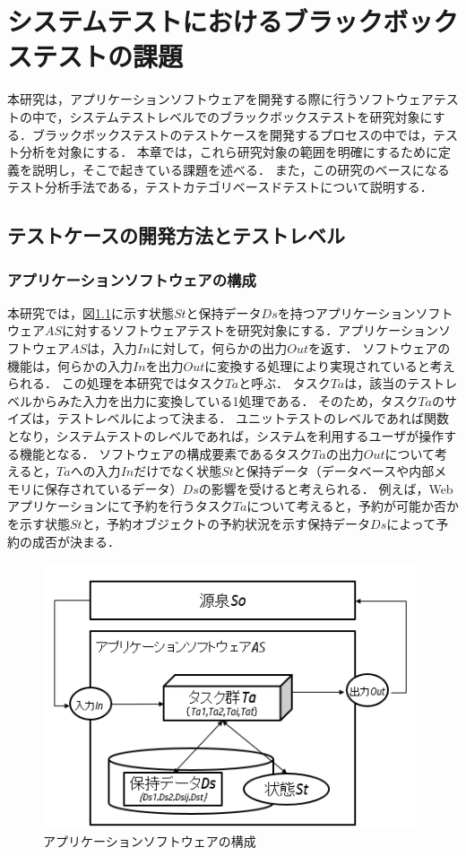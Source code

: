 \chapter{システムテストにおけるブラックボックステストの課題}
本研究は，アプリケーションソフトウェアを開発する際に行うソフトウェアテストの中で，システムテストレベルでのブラックボックステストを研究対象にする．ブラックボックステストのテストケースを開発するプロセスの中では，テスト分析を対象にする．
本章では，これら研究対象の範囲を明確にするために定義を説明し，そこで起きている課題を述べる．
また，この研究のベースになるテスト分析手法である，テストカテゴリベースドテストについて説明する．

\newpage
\section{テストケースの開発方法とテストレベル}
\subsection{アプリケーションソフトウェアの構成}
本研究では，図\ref{fig:fig-1}に示す状態$St$と保持データ$Ds$を持つアプリケーションソフトウェア$AS$に対するソフトウェアテストを研究対象にする．アプリケーションソフトウェア$AS$は，入力$In$に対して，何らかの出力$Out$を返す．
ソフトウェアの機能は，何らかの入力$In$を出力$Out$に変換する処理により実現されていると考えられる．
この処理を本研究ではタスク$Ta$と呼ぶ\cite{yumoto2017ICST}．
タスク$Ta$は，該当のテストレベルからみた入力を出力に変換している1処理である．
そのため，タスク$Ta$のサイズは，テストレベルによって決まる．
ユニットテストのレベルであれば関数となり，システムテストのレベルであれば，システムを利用するユーザが操作する機能となる．
ソフトウェアの構成要素であるタスク$Ta$の出力$Out$について考えると，$Ta$への入力$In$だけでなく状態$St$と保持データ（データベースや内部メモリに保存されているデータ）$Ds$の影響を受けると考えられる．
例えば，Webアプリケーションにて予約を行うタスク$Ta$について考えると，予約が可能か否かを示す状態$St$と，予約オブジェクトの予約状況を示す保持データ$Ds$によって予約の成否が決まる．

\begin{figure}[H]
  \begin{center}
  \includegraphics[width=11cm]{./image/fig-1.png}
  \caption{アプリケーションソフトウェアの構成}
  \label{fig:fig-1}
  \end{center}
\end{figure}


